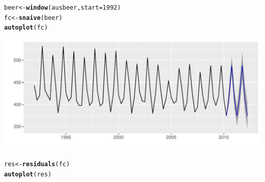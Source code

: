 \documentclass[12pt]{article}\usepackage[]{graphicx}\usepackage[]{xcolor}
\makeatletter
\def\maxwidth{ %
  \ifdim\Gin@nat@width>\linewidth
    \linewidth
  \else
    \Gin@nat@width
  \fi
}
\newcommand{\hlnum}[1]{\textcolor[rgb]{0.686,0.059,0.569}{#1}}%
\newcommand{\hldef}[1]{\textcolor[rgb]{0.345,0.345,0.345}{#1}}%
\newcommand{\hlkwb}[1]{\textcolor[rgb]{0.69,0.353,0.396}{#1}}%
\newcommand{\hlkwc}[1]{\textcolor[rgb]{0.333,0.667,0.333}{#1}}%
\newcommand{\hlkwd}[1]{\textcolor[rgb]{0.737,0.353,0.396}{\textbf{#1}}}%
\newenvironment{kframe}{%
 \def\at@end@of@kframe{}%
 \ifinner\ifhmode%
  \def\at@end@of@kframe{\end{minipage}}%
  \begin{minipage}{\columnwidth}%
 \fi\fi%
 \def\FrameCommand##1{\hskip\@totalleftmargin \hskip-\fboxsep
 \colorbox{shadecolor}{##1}\hskip-\fboxsep
     \hskip-\linewidth \hskip-\@totalleftmargin \hskip\columnwidth}%
 \MakeFramed {\advance\hsize-\width
   \@totalleftmargin\z@ \linewidth\hsize
   \@setminipage}}%
 {\par\unskip\endMakeFramed%
 \at@end@of@kframe}
\newenvironment{knitrout}{}{} %
\makeatother
\begin{document}
\begin{knitrout}
\color{fgcolor}\begin{kframe}
\begin{alltt}
\hldef{beer} \hlkwb{<-} \hlkwd{window}\hldef{(ausbeer,} \hlkwc{start}\hldef{=}\hlnum{1992}\hldef{)}
\hldef{fc} \hlkwb{<-} \hlkwd{snaive}\hldef{(beer)}
\hlkwd{autoplot}\hldef{(fc)}
\end{alltt}
\end{kframe}
\includegraphics[width=\maxwidth]{figure/unnamed-chunk-8-1} 
\begin{kframe}\begin{alltt}
\hldef{res} \hlkwb{<-} \hlkwd{residuals}\hldef{(fc)}
\hlkwd{autoplot}\hldef{(res)}
\end{alltt}



\end{kframe}
\end{knitrout}
\end{document}
